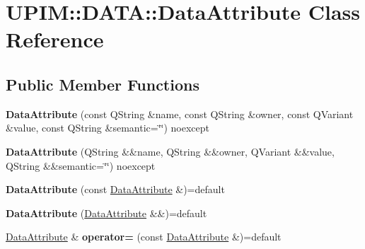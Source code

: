 \hypertarget{classUPIM_1_1DATA_1_1DataAttribute}{}\section{U\+P\+IM\+:\+:D\+A\+TA\+:\+:Data\+Attribute Class Reference}
\label{classUPIM_1_1DATA_1_1DataAttribute}
\subsection*{Public Member Functions}
\begin{DoxyCompactItemize}
\item 
\mbox{\label{classUPIM_1_1DATA_1_1DataAttribute_a27a63d2d4236f2b95be776deb6030908}} 
{\bfseries Data\+Attribute} (const Q\+String \&name, const Q\+String \&owner, const Q\+Variant \&value, const Q\+String \&semantic=\char`\"{}\char`\"{}) noexcept
\item 
\mbox{\label{classUPIM_1_1DATA_1_1DataAttribute_a7c921cbc0dfe0ae90d2dc7d6b457a422}} 
{\bfseries Data\+Attribute} (Q\+String \&\&name, Q\+String \&\&owner, Q\+Variant \&\&value, Q\+String \&\&semantic=\char`\"{}\char`\"{}) noexcept
\item 
\mbox{\label{classUPIM_1_1DATA_1_1DataAttribute_aef41aa9c43f0019b02bc23a9291aa428}} 
{\bfseries Data\+Attribute} (const \hyperlink{classUPIM_1_1DATA_1_1DataAttribute}{Data\+Attribute} \&)=default
\item 
\mbox{\label{classUPIM_1_1DATA_1_1DataAttribute_a6bc1c4cb0a7219462f6d0146965fd5c3}} 
{\bfseries Data\+Attribute} (\hyperlink{classUPIM_1_1DATA_1_1DataAttribute}{Data\+Attribute} \&\&)=default
\item 
\mbox{\label{classUPIM_1_1DATA_1_1DataAttribute_acf4b72076e55afbf5be78028ae006013}} 
\hyperlink{classUPIM_1_1DATA_1_1DataAttribute}{Data\+Attribute} \& {\bfseries operator=} (const \hyperlink{classUPIM_1_1DATA_1_1DataAttribute}{Data\+Attribute} \&)=default
\item 
\mbox{\label{classUPIM_1_1DATA_1_1DataAttribute_a8cb2657b254f2a62db6d14c39cac2865}} 

\end{DoxyCompactItemize}
